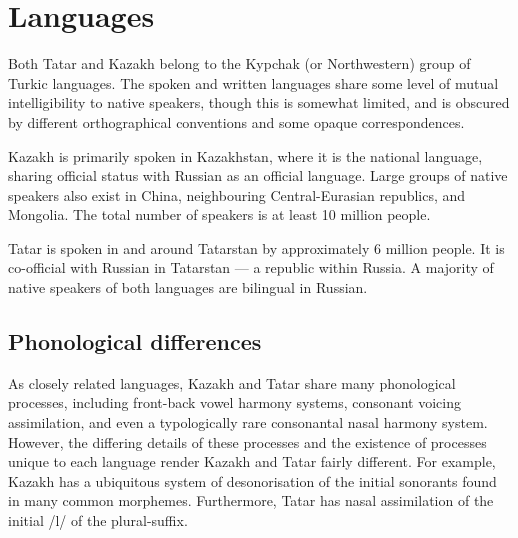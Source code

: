 \documentclass[11pt]{article}
\begin{document}


\section{Languages}
\label{sec:lang}

Both Tatar and Kazakh belong to the Kypchak (or Northwestern) group of Turkic
languages.  The spoken and written languages share some level of mutual intelligibility to native 
speakers, though this is somewhat limited, and is obscured by different orthographical 
conventions and some opaque correspondences.

Kazakh is primarily spoken in Kazakhstan, where it is the national
language, sharing official status with Russian as an official language.
Large groups of native speakers also exist in China, neighbouring
Central-Eurasian republics, and Mongolia. The total number of speakers is at least 10 million people.

Tatar is spoken in and around Tatarstan by
approximately 6 million people. It is co-official with Russian in Tatarstan ---
a republic within Russia.  A majority of native speakers of both languages are bilingual in Russian. %

\subsection{Phonological differences}
As closely related languages, Kazakh and Tatar share many phonological processes, including 
front-back vowel harmony systems, consonant voicing assimilation, and even a typologically rare 
consonantal nasal harmony system.  However, the differing details of these processes and the existence of 
processes unique to each language render Kazakh and Tatar fairly different.  For example, Kazakh has a 
ubiquitous system of desonorisation of the initial sonorants found in many common morphemes.  Furthermore, Tatar 
has nasal assimilation of the initial /l/ of the plural-suffix.
\end{document}
